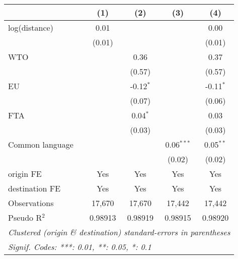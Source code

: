 
\begingroup
\centering
\small
\begin{tabular}{lcccc}
   \toprule
                   & (1)     & (2)         & (3)          & (4)\\  
   \midrule 
   log(distance)   & 0.01    &             &              & 0.00\\   
                   & (0.01)  &             &              & (0.01)\\   
   WTO             &         & 0.36        &              & 0.37\\   
                   &         & (0.57)      &              & (0.57)\\   
   EU              &         & -0.12$^{*}$ &              & -0.11$^{*}$\\   
                   &         & (0.07)      &              & (0.06)\\   
   FTA             &         & 0.04$^{*}$  &              & 0.03\\   
                   &         & (0.03)      &              & (0.03)\\   
   Common language &         &             & 0.06$^{***}$ & 0.05$^{**}$\\   
                   &         &             & (0.02)       & (0.02)\\   
   \midrule 
   origin FE       & Yes     & Yes         & Yes          & Yes\\  
   destination FE  & Yes     & Yes         & Yes          & Yes\\  
   \midrule 
   Observations    & 17,670  & 17,670      & 17,442       & 17,442\\  
   Pseudo R$^2$    & 0.98913 & 0.98919     & 0.98915      & 0.98920\\  
   \bottomrule
   \multicolumn{5}{l}{\emph{Clustered (origin \& destination) standard-errors in parentheses}}\\
   \multicolumn{5}{l}{\emph{Signif. Codes: ***: 0.01, **: 0.05, *: 0.1}}\\
\end{tabular}
\par\endgroup


